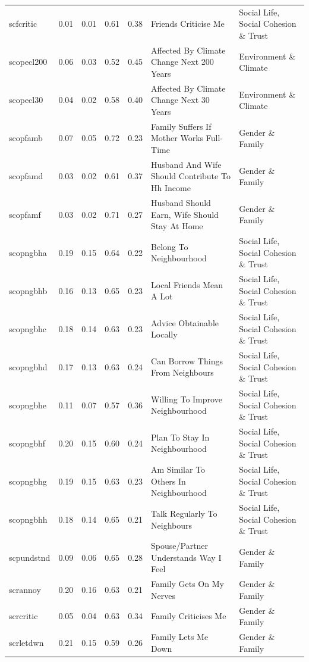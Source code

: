 \documentclass[
  12pt,
]{article}
\begin{document}
\begin{landscape}
\begin{scriptsize}
\begin{longtable}{|p{1.75in}|p{0.3in}|p{0.3in}|p{0.3in}|p{0.3in}|p{2.5in}|p{2.5in}}
scfcritic & 0.01 & 0.01 & 0.61 & 0.38 & Friends Criticise Me & Social Life, Social Cohesion \& Trust \\ 
scopecl200 & 0.06 & 0.03 & 0.52 & 0.45 & Affected By Climate Change Next 200 Years & Environment \& Climate \\ 
scopecl30 & 0.04 & 0.02 & 0.58 & 0.40 & Affected By Climate Change Next 30 Years & Environment \& Climate \\ 
scopfamb & 0.07 & 0.05 & 0.72 & 0.23 & Family Suffers If Mother Works Full-Time & Gender \& Family \\ 
scopfamd & 0.03 & 0.02 & 0.61 & 0.37 & Husband And Wife Should Contribute To Hh Income & Gender \& Family \\ 
scopfamf & 0.03 & 0.02 & 0.71 & 0.27 & Husband Should Earn, Wife Should Stay At Home & Gender \& Family \\ 
scopngbha & 0.19 & 0.15 & 0.64 & 0.22 & Belong To Neighbourhood & Social Life, Social Cohesion \& Trust \\ 
scopngbhb & 0.16 & 0.13 & 0.65 & 0.23 & Local Friends Mean A Lot & Social Life, Social Cohesion \& Trust \\ 
scopngbhc & 0.18 & 0.14 & 0.63 & 0.23 & Advice Obtainable Locally & Social Life, Social Cohesion \& Trust \\ 
scopngbhd & 0.17 & 0.13 & 0.63 & 0.24 & Can Borrow Things From Neighbours & Social Life, Social Cohesion \& Trust \\ 
scopngbhe & 0.11 & 0.07 & 0.57 & 0.36 & Willing To Improve Neighbourhood & Social Life, Social Cohesion \& Trust \\ 
scopngbhf & 0.20 & 0.15 & 0.60 & 0.24 & Plan To Stay In Neighbourhood & Social Life, Social Cohesion \& Trust \\ 
scopngbhg & 0.19 & 0.15 & 0.63 & 0.23 & Am Similar To Others In Neighbourhood & Social Life, Social Cohesion \& Trust \\ 
scopngbhh & 0.18 & 0.14 & 0.65 & 0.21 & Talk Regularly To Neighbours & Social Life, Social Cohesion \& Trust \\ 
scpundstnd & 0.09 & 0.06 & 0.65 & 0.28 & Spouse/Partner Understands Way I Feel & Gender \& Family \\ 
scrannoy & 0.20 & 0.16 & 0.63 & 0.21 & Family Gets On My Nerves & Gender \& Family \\ 
scrcritic & 0.05 & 0.04 & 0.63 & 0.34 & Family Criticises Me & Gender \& Family \\ 
scrletdwn & 0.21 & 0.15 & 0.59 & 0.26 & Family Lets Me Down & Gender \& Family \\ 

\end{longtable}
\end{scriptsize}
\end{landscape}
\end{document}
